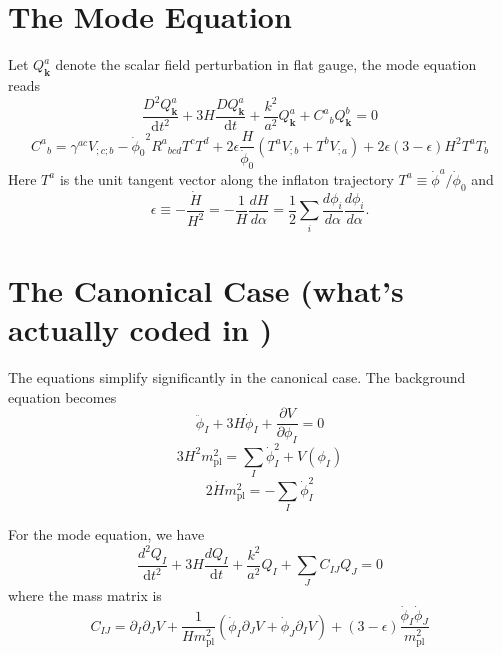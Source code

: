 \documentclass[11pt]{article}
\newcommand{\mpl}{m_{\mathrm{pl}}}
\newcommand{\ud}{\mathrm{d}}
\newcommand{\pd}{\partial}
\def\bk{{\mathbf{k}}}
\def\f {{\phi}}
\begin{document}
\section{The Mode Equation}

Let $Q^a_\bk$ denote the scalar field perturbation in flat gauge, the mode equation reads \cite{Sasaki:1995aw}
\begin{equation}
\frac{D^2 Q_\bk^a}{\ud t^2} + 3H \frac{D Q_\bk^a}{\ud t} + \frac{k^2}{a^2} Q^a_\bk + {C^a}_b Q^b_\bk = 0
\end{equation}
\begin{equation}
{C^a}_b = \gamma^{ac}V_{;c;b} - {\dot\f_0}^2 {R^a}_{bcd} T^c T^d + 2\epsilon \frac{H}{\dot\f_0} (T^a V_{;b} + T^b V_{;a}) + 2\epsilon(3-\epsilon) H^2 T^a T_b
\end{equation}
Here $T^a$ is the unit tangent vector along the inflaton trajectory
$T^a \equiv \dot{\f}^a/\dot{\f}_0$ and
\begin{equation}
  \epsilon\equiv-\frac{\dot H}{H^2}=-\frac{1}{H}\frac{dH}{d\alpha}=\frac{1}{2}\sum_i \frac{d\phi_i}{d\alpha} \frac{d\phi_i}{d\alpha}.
  \label{eqn:XXX}
\end{equation}

\section{The Canonical Case (what's actually coded in )}

The equations simplify significantly in the canonical case. The background equation becomes 
\begin{equation}
\ddot{\phi}_I + 3H \dot{\phi}_I + \frac{\pd V}{\pd \phi_I} = 0  
\end{equation}
\begin{equation}\label{eq_H}
3H^2 \mpl^2 = \sum_I \dot{\phi}_I^2 + V(\phi_I)
\end{equation}
\begin{equation}
2\dot{H} \mpl^2 = -\sum_I \dot{\phi}_I^2
\end{equation}

For the mode equation, we have
\begin{equation}
\frac{d^2 Q_I}{\ud t^2} + 3H \frac{d Q_I}{\ud t} + \frac{k^2}{a^2} Q_I + \sum_J C_{IJ} Q_J = 0
\end{equation}
where the mass matrix is
\begin{equation}
C_{IJ} = \pd_I\pd_J V + \frac{1}{H \mpl^2} \left( \dot{\phi}_I \pd_J V + \dot{\phi}_J \pd_I V \right)
+ (3-\epsilon) \frac{\dot{\phi}_I\dot{\phi}_J}{\mpl^2}
\label{eqn:massmatrix}
\end{equation}
\end{document}
